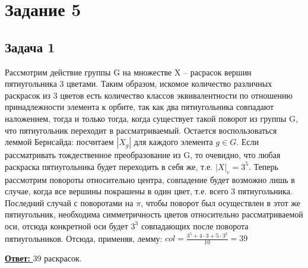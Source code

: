 \documentclass[a4paper,14pt]{article} %
\begin{document}

\section{Задание 5}
\subsection{Задача 1}
Рассмотрим действие группы G на множестве X -- расрасок вершин пятиугольника 3 цветами.
Таким образом, искомое количество различных раскрасок из 3 цветов есть количество классов эквивалентности по отношению принадлежности элемента к орбите, так как два пятиугольника
совпадают наложением, тогда и только тогда, когда существует такой поворот из группы G, что пятиугольник переходит в рассматриваемый. 
Остается воспользоваться леммой Бернсайда: посчитаем $|X_g|$ для каждого элемента $g \in G$. Если рассматривать тождественное преобразование из G, то очевидно, что любая раскраска
 пятиугольника будет переходить в себя же, т.е. $|X|_e = 3^5$. Теперь рассмотрим повороты относительно центра, совпадение будет возможно лишь в случае, когда все вершины покрашены в один цвет, 
т.е. всего 3 пятиугольника. Последний случай с поворотами на $\pi$, чтобы поворот был осуществлен в этот же пятиугольник, необходима симметричность цветов относительно рассматриваемой оси, отсюда
конкретной оси будет $3^3$ совпадающих после поворота пятиугольников. Отсюда, применяя, лемму: $col = \frac{3^5 + 4 \cdot 3 + 5 \cdot 3^3}{10} = 39$

\underline{\textbf{Ответ: }} 39 раскрасок.
\end{document}

